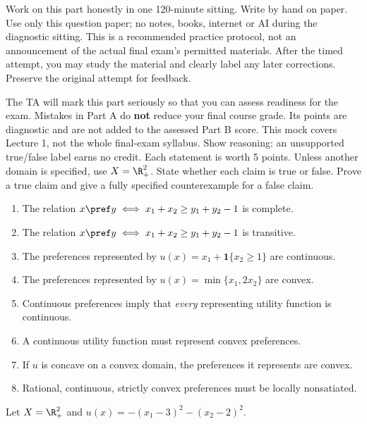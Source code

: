 Work on this part honestly in one 120-minute sitting. Write by hand on paper. Use only this question paper; no notes, books, internet or AI during the diagnostic sitting. This is a recommended practice protocol, not an announcement of the actual final exam's permitted materials. After the timed attempt, you may study the material and clearly label any later corrections. Preserve the original attempt for feedback.

The TA will mark this part seriously so that you can assess readiness for the exam. Mistakes in Part A do \textbf{not} reduce your final course grade. Its points are diagnostic and are not added to the assessed Part B score. This mock covers Lecture 1, not the whole final-exam syllabus. Show reasoning: an unsupported true/false label earns no credit.
\conventions
{}
Each statement is worth 5 points. Unless another domain is specified, use $X=\R_+^2$. State whether each claim is true or false. Prove a true claim and give a fully specified counterexample for a false claim.
\begin{enumerate}[label=(\alph*)]
\item The relation $x\pref y\iff x_1+x_2\ge y_1+y_2-1$ is complete.
\item The relation $x\pref y\iff x_1+x_2\ge y_1+y_2-1$ is transitive.
\item The preferences represented by $u(x)=x_1+\mathbf1\{x_2\ge1\}$ are continuous.
\item The preferences represented by $u(x)=\min\{x_1,2x_2\}$ are convex.
\item Continuous preferences imply that \emph{every} representing utility function is continuous.
\item A continuous utility function must represent convex preferences.
\item If $u$ is concave on a convex domain, the preferences it represents are convex.
\item Rational, continuous, strictly convex preferences must be locally nonsatiated.
\end{enumerate}
\clearpage
{}
Let $X=\R_+^2$ and $u(x)=-(x_1-3)^2-(x_2-2)^2$.

